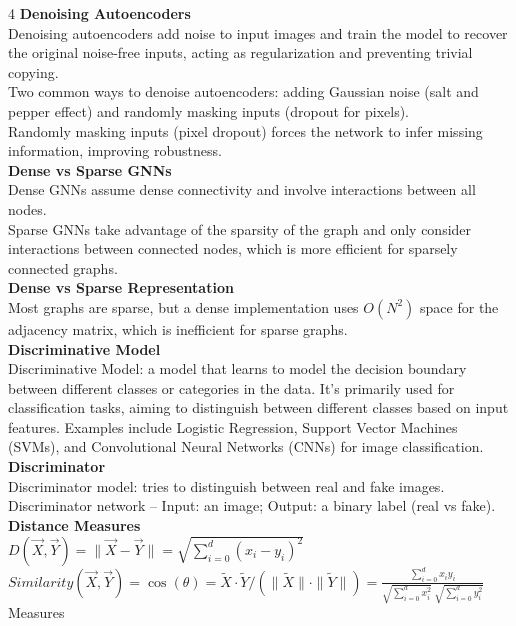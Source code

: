 \documentclass[8pt]{extarticle}
\begin{document}
\begin{multicols}{4}
\vspace{2pt}\textbf{Denoising Autoencoders}\\
Denoising autoencoders add noise to input images and train the model to recover the original noise-free inputs, acting as regularization and preventing trivial copying.\\
Two common ways to denoise autoencoders: adding Gaussian noise (salt and pepper effect) and randomly masking inputs (dropout for pixels).\\
Randomly masking inputs (pixel dropout) forces the network to infer missing information, improving robustness.\\
\vspace{2pt}\textbf{Dense vs Sparse GNNs}\\
Dense GNNs assume dense connectivity and involve interactions between all nodes.\\
Sparse GNNs take advantage of the sparsity of the graph and only consider interactions between connected nodes, which is more efficient for sparsely connected graphs.\\
\vspace{2pt}\textbf{Dense vs Sparse Representation}\\
Most graphs are sparse, but a dense implementation uses $O(N^{2})$ space for the adjacency matrix, which is inefficient for sparse graphs.\\
\vspace{2pt}\textbf{Discriminative Model}\\
Discriminative Model: a model that learns to model the decision boundary between different classes or categories in the data. It's primarily used for classification tasks, aiming to distinguish between different classes based on input features. Examples include Logistic Regression, Support Vector Machines (SVMs), and Convolutional Neural Networks (CNNs) for image classification.\\
\vspace{2pt}\textbf{Discriminator}\\
Discriminator model: tries to distinguish between real and fake images.\\
Discriminator network -- Input: an image; Output: a binary label (real vs fake).\\
\vspace{2pt}\textbf{Distance Measures}\\
$D(\vec X,\vec Y)=\|\vec X-\vec Y\|=\sqrt{\sum_{i=0}^{d}(x_i-y_i)^{2}}$\\
$Similarity(\vec X,\vec Y)=\cos(\theta)=\tilde X\cdot\tilde Y/(\|\tilde X\|\cdot\|\tilde Y\|)=\frac{\sum_{i=0}^{d} x_i y_i}{\sqrt{\sum_{i=0}^{d} x_i^{2}}\;\sqrt{\sum_{i=0}^{d} y_i^{2}}}$\Distance Measures\\

\end{multicols}
\end{document}
